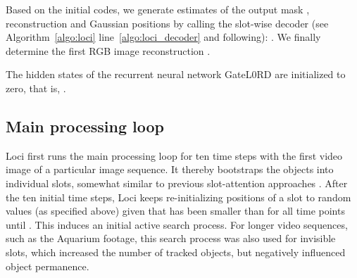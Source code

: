 \documentclass{article} \usepackage{iclr2023_conference_arxiv,times}
\begin{document}
Based on the initial codes, we generate estimates of the output mask , reconstruction  and Gaussian positions  by calling the slot-wise decoder (see Algorithm~\ref{algo:loci} line~\ref{algo:loci_decoder} and following): 
.
We finally determine the first RGB image reconstruction .

The hidden states of the recurrent neural network GateL0RD are initialized to zero, that is, .


\subsection{Main processing loop}
Loci first runs the main processing loop for ten time steps with the first video image of a particular image sequence. It thereby bootstraps the objects into individual slots, somewhat similar to previous slot-attention approaches \cite{Locatello:2020}.
After the ten initial time steps, Loci keeps re-initializing positions  of a slot  to random values (as specified above) given that  has been smaller than  for all time points until . This induces an initial active search process.
For longer video sequences, such as the Aquarium footage, this search process was also used for invisible slots, which increased the number of tracked objects, but negatively influenced object permanence.
\end{document}
